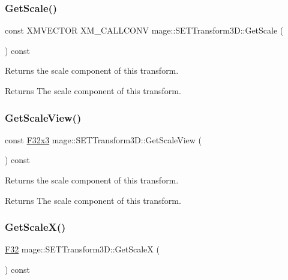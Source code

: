\subsubsection{\texorpdfstring{Get\+Scale()}{GetScale()}}
{\footnotesize\ttfamily const X\+M\+V\+E\+C\+T\+OR X\+M\+\_\+\+C\+A\+L\+L\+C\+O\+NV mage\+::\+S\+E\+T\+Transform3\+D\+::\+Get\+Scale (\begin{DoxyParamCaption}{ }\end{DoxyParamCaption}) const\hspace{0.3cm}{\ttfamily [noexcept]}}

Returns the scale component of this transform.

\begin{DoxyReturn}{Returns}
The scale component of this transform. 
\end{DoxyReturn}
\mbox{\label{classmage_1_1_s_e_t_transform3_d_a48bf69795eb946ffdcf28991c7a74537}} 
\subsubsection{\texorpdfstring{Get\+Scale\+View()}{GetScaleView()}}
{\footnotesize\ttfamily const \mbox{\hyperlink{namespacemage_a1e3c7a882af461f161caa1cbddaf1fa2}{F32x3}} mage\+::\+S\+E\+T\+Transform3\+D\+::\+Get\+Scale\+View (\begin{DoxyParamCaption}{ }\end{DoxyParamCaption}) const\hspace{0.3cm}{\ttfamily [noexcept]}}

Returns the scale component of this transform.

\begin{DoxyReturn}{Returns}
The scale component of this transform. 
\end{DoxyReturn}
\mbox{\label{classmage_1_1_s_e_t_transform3_d_ad7d2448b6c03628b412a7effbc26945d}} 
\subsubsection{\texorpdfstring{Get\+Scale\+X()}{GetScaleX()}}
{\footnotesize\ttfamily \mbox{\hyperlink{namespacemage_aa97e833b45f06d60a0a9c4fc22ae02c0}{F32}} mage\+::\+S\+E\+T\+Transform3\+D\+::\+Get\+ScaleX (\begin{DoxyParamCaption}{ }\end{DoxyParamCaption}) const\hspace{0.3cm}{\ttfamily [noexcept]}}

